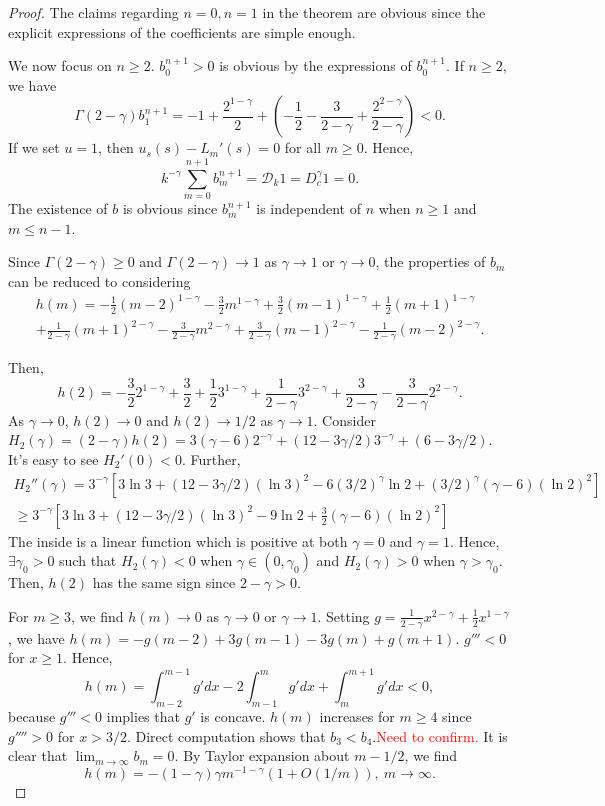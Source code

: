 \documentclass[11pt]{article}
\newcommand{\tcr}[1]{\textcolor{red}{#1}}
\begin{document}
\begin{proof}
The claims regarding $n=0, n=1$ in the theorem are obvious since the explicit expressions of the coefficients are simple enough.

We now focus on $n\ge 2$. $b_0^{n+1}>0$ is obvious by the expressions of $b_0^{n+1}$. If $n\ge 2$, we have $$
\Gamma(2-\gamma)b_1^{n+1}=-1+\frac{2^{1-\gamma}}{2}+(-\frac{1}{2}-\frac{3}{2-\gamma}+\frac{2^{2-\gamma}}{2-\gamma})< 0.
$$
If we set $u=1$, then $u_s(s)-L_m'(s)=0$ for all $m\ge 0$. Hence, $$
k^{-\gamma}\sum_{m=0}^{n+1}b_m^{n+1}=\mathcal{D}_k1=D_c^{\gamma}1=0.
$$
The existence of $b$ is obvious since $b_m^{n+1}$ is independent of $n$ when $n\ge 1$ and $m\le n-1$.

Since $\Gamma(2-\gamma)\ge 0$ and $\Gamma(2-\gamma)\to 1$ as $\gamma\to 1$ or $\gamma\to 0$, the properties of $b_m$ can be reduced to considering
\begin{multline*}
h(m)=-\frac{1}{2}(m-2)^{1-\gamma}-\frac{3}{2}m^{1-\gamma}+\frac{3}{2}(m-1)^{1-\gamma}+\frac{1}{2}(m+1)^{1-\gamma}\\
+\frac{1}{2-\gamma}(m+1)^{2-\gamma}
-\frac{3}{2-\gamma}m^{2-\gamma}
+\frac{3}{2-\gamma}(m-1)^{2-\gamma}
-\frac{1}{2-\gamma}(m-2)^{2-\gamma}.
\end{multline*}


Then, $$
h(2)=-\frac{3}{2}2^{1-\gamma}+\frac{3}{2}+\frac{1}{2}3^{1-\gamma}
+\frac{1}{2-\gamma}3^{2-\gamma}
+\frac{3}{2-\gamma}-\frac{3}{2-\gamma}2^{2-\gamma}.
$$
As $\gamma\to 0$, $h(2)\to 0$ and $h(2)\to 1/2$ as $\gamma\to 1$. 
Consider $H_2(\gamma)=(2-\gamma)h(2)=3(\gamma-6)2^{-\gamma}+(12-3\gamma/2)3^{-\gamma}
+(6-3\gamma/2)$. It's easy to see $H_2'(0)<0$. Further, 
\begin{multline*}
H_2''(\gamma)=3^{-\gamma}[3\ln 3+(12-3\gamma/2)(\ln 3)^2
-6(3/2)^{\gamma}\ln 2+(3/2)^{\gamma}(\gamma-6)(\ln 2)^2]\\
\ge 3^{-\gamma}[3\ln 3+(12-3\gamma/2)(\ln 3)^2
-9\ln 2+\frac{3}{2}(\gamma-6)(\ln 2)^2]
\end{multline*}
The inside is a linear function which is positive at both $\gamma=0$ and $\gamma=1$. Hence, $\exists \gamma_0>0$ such that $H_2(\gamma)<0$ when $\gamma\in(0,\gamma_0)$ and $H_2(\gamma)>0$ when $\gamma>\gamma_0$. Then, $h(2)$ has the same sign since $2-\gamma>0$.

For $m\ge 3$, we find $h(m)\to 0$ as $\gamma\to 0$ or $\gamma\to 1$. Setting $g=\frac{1}{2-\gamma}x^{2-\gamma}+\frac{1}{2}x^{1-\gamma}$, we have
$h(m)=-g(m-2)+3g(m-1)-3g(m)+g(m+1)$. $g'''<0$ for $x\ge 1$. Hence, $$
h(m)=\int_{m-2}^{m-1}g' dx-2\int_{m-1}^{m}g' dx
+\int_{m}^{m+1}g' dx<0,
$$
because $g'''<0$ implies that $g'$ is concave. $h(m)$ increases for $m\ge 4$ since $g''''>0$ for $x>3/2$. 
Direct computation shows that $b_3<b_4$.\tcr{Need to confirm.}
It is clear that $\lim_{m\to\infty}b_m=0$. By Taylor expansion about $m-1/2$, we find $$
h(m)=-(1-\gamma)\gamma m^{-1-\gamma}(1+O(1/m)),\ m\to\infty.
$$


\end{proof}
\end{document}
